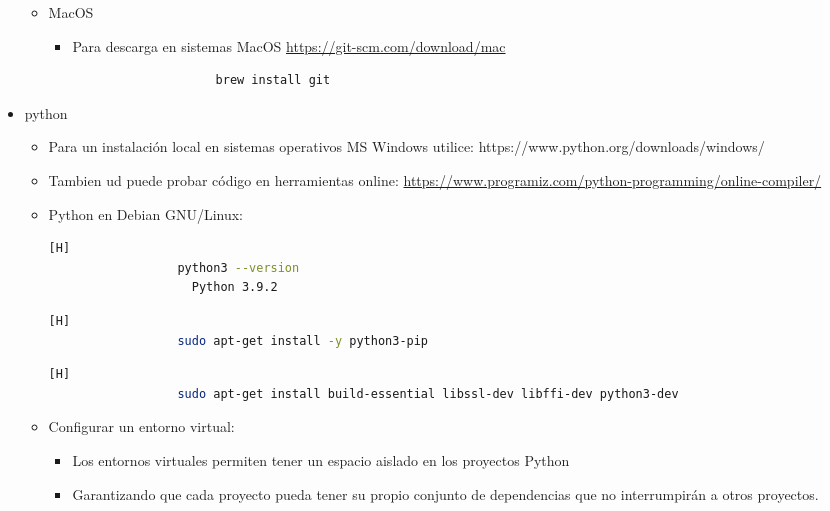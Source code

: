 \documentclass{article}
\begin{document}
\begin{itemize}
\begin{itemize}
\begin{itemize}
            \end{itemize}
            \item MacOS
            \begin{itemize}
                \item Para descarga en sistemas MacOS \url{https://git-scm.com/download/mac}
                \begin{lstlisting}
                    brew install git
                \end{lstlisting}
            \end{itemize}
        \end{itemize}
        \item python
        \begin{itemize}
            \item Para un instalación local en sistemas operativos MS Windows utilice: https://www.python.org/downloads/windows/
            \item Tambien ud puede probar código en herramientas online: \url{https://www.programiz.com/python-programming/online-compiler/}
            \item Python en Debian GNU/Linux:
            \begin{lstlisting}[language=bash,caption={Debian Linux viene con Python 3 y Python 2 preinstalados.}][H]
		          python3 --version
                    Python 3.9.2
	        \end{lstlisting}
            \begin{lstlisting}[language=bash,caption={Instalemos pip, una herramienta que instalará y administrará los paquetes de programación que queramos usar en nuestros proyectos de desarrollo.}][H]
		          sudo apt-get install -y python3-pip
	        \end{lstlisting}
            \begin{lstlisting}[language=bash,caption={Paquetes y herramientas de desarrollo más para instalar para garantizar que tengamos una configuración sólida para nuestro entorno de programación:}][H]
		          sudo apt-get install build-essential libssl-dev libffi-dev python3-dev
	        \end{lstlisting}
            \item Configurar un entorno virtual:
            \begin{itemize}
                \item Los entornos virtuales permiten tener un espacio aislado en los proyectos Python
                \item Garantizando que cada proyecto pueda tener su propio conjunto de dependencias que no interrumpirán a otros proyectos.

\end{itemize}
\end{itemize}
\end{itemize}
\end{document}
